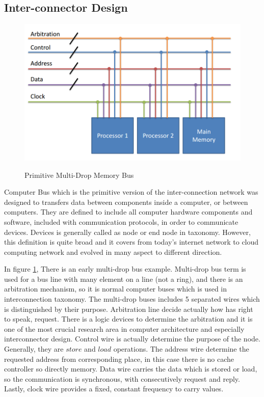 \subsection{Inter-connector Design}
\begin{figure}[h!]
    \centering
    \includegraphics[width=1\textwidth]{img/bus_primatives.png}
    \caption{Primitive Multi-Drop Memory Bus }
    \cite{ComputerArchCoursera}
    \label{fig:bus_primative}
\end{figure}
Computer Bus which is the primitive version of the inter-connection network was designed to transfers data between components inside a computer, or between computers. They are defined to include all computer hardware components and software, included with communication protocols, in order to communicate devices. Devices is generally called as node or end node in taxonomy. However, this definition is quite broad and it covers from today's internet network to cloud computing network and evolved in many aspect to different direction.

In figure \ref{fig:bus_primative}, There is an early multi-drop bus example. Multi-drop bus term is used for a bus line with many element on a line (not a ring), and there is an arbitration mechanism, so it is normal computer buses which is used in interconnection taxonomy. The multi-drop buses includes 5 separated wires which is distinguished by their purpose. Arbitration line decide actually how has right to speak, request. There is a logic devices to determine the arbitration and it is one of the most crucial research area in computer architecture and especially interconnector design\cite{hennessy2012computer}. Control wire is actually determine the purpose of the node. Generally, they are $store$ and $load$ operations. The address wire determine the requested address from corresponding place, in this case there is no cache controller so directly memory. Data wire carries the data which is stored or load, so the communication is synchronous, with consecutively request and reply. Lastly, clock wire provides a fixed, constant frequency to carry values.\cite{hennessy2012computer}

